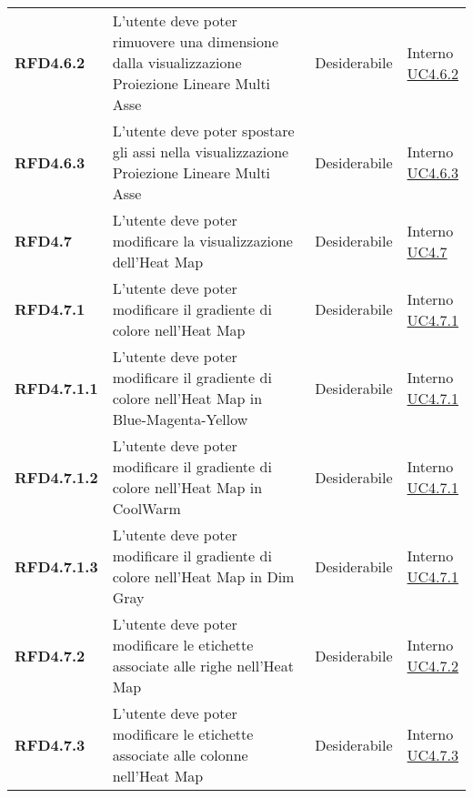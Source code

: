 \begin{longtable}[H]{| >{\raggedright\bfseries}m{20mm} | >{\raggedright}m{90mm} | >{\centering}m{25mm} | >{\centering\arraybackslash}m{30mm}|}
    RFD4.6.2
    & L'utente deve poter rimuovere una dimensione dalla visualizzazione Proiezione Lineare Multi Asse
    & Desiderabile
    & \makecell{ Interno \\  \hyperref[par:uc4.6.2]{UC4.6.2} }\\

    RFD4.6.3
    & L'utente deve poter spostare gli assi nella visualizzazione Proiezione Lineare Multi Asse
    & Desiderabile
    & \makecell{ Interno \\  \hyperref[par:uc4.6.3]{UC4.6.3} }\\

    RFD4.7
    & L'utente deve poter modificare la visualizzazione dell'Heat Map
    & Desiderabile
    & \makecell{ Interno \\  \hyperref[ssub:uc4.7]{UC4.7} }\\

    RFD4.7.1
    & L'utente deve poter modificare il gradiente di colore nell'Heat Map
    & Desiderabile
    & \makecell{ Interno \\  \hyperref[par:uc4.7.1]{UC4.7.1} }\\

    RFD4.7.1.1
    & L'utente deve poter modificare il gradiente di colore nell'Heat Map in Blue-Magenta-Yellow
    & Desiderabile
    & \makecell{ Interno \\  \hyperref[par:uc4.7.1]{UC4.7.1} }\\

    RFD4.7.1.2
    & L'utente deve poter modificare il gradiente di colore nell'Heat Map in CoolWarm
    & Desiderabile
    & \makecell{ Interno \\  \hyperref[par:uc4.7.1]{UC4.7.1} }\\

    RFD4.7.1.3
    & L'utente deve poter modificare il gradiente di colore nell'Heat Map in Dim Gray
    & Desiderabile
    & \makecell{ Interno \\  \hyperref[par:uc4.7.1]{UC4.7.1} }\\

    RFD4.7.2
    & L'utente deve poter modificare le etichette associate alle righe nell'Heat Map
    & Desiderabile
    & \makecell{ Interno \\  \hyperref[par:uc4.7.2]{UC4.7.2} }\\

    RFD4.7.3
    & L'utente deve poter modificare le etichette associate alle colonne nell'Heat Map
    & Desiderabile
    & \makecell{ Interno \\  \hyperref[par:uc4.7.3]{UC4.7.3} }\\


\end{longtable}
